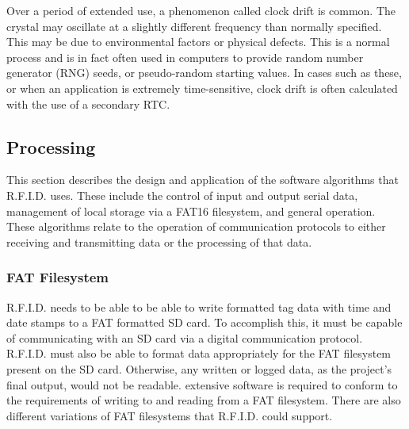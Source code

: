 Over a period of extended use, a phenomenon called clock drift is common. The crystal may oscillate at a slightly different frequency than normally specified. This may be due to environmental factors or physical defects. This is a normal process and is in fact often used in computers to provide random number generator (RNG) seeds, or pseudo-random starting values. In cases such as these, or when an application is extremely time-sensitive, clock drift is often calculated with the use of a secondary RTC.

\subsection{Processing}
This section describes the design and application of the software algorithms that R.F.I.D. uses. These include the control of input and output serial data, management of local storage via a FAT16 filesystem, and general operation. These algorithms relate to the operation of communication protocols to either receiving and transmitting data or the processing of that data.


\label{sss:FAT}
\subsubsection{FAT Filesystem} %

R.F.I.D. needs to be able to be able to write formatted tag data with time and date stamps to a FAT formatted SD card. To accomplish this, it must be capable of communicating with an SD card via a digital communication protocol. R.F.I.D. must also be able to format data appropriately for the FAT filesystem present on the SD card. Otherwise, any written or logged data, as the project's final output, would not be readable. extensive software is required to conform to the requirements of writing to and reading from a FAT filesystem. There are also different variations of FAT filesystems that R.F.I.D. could support. 




